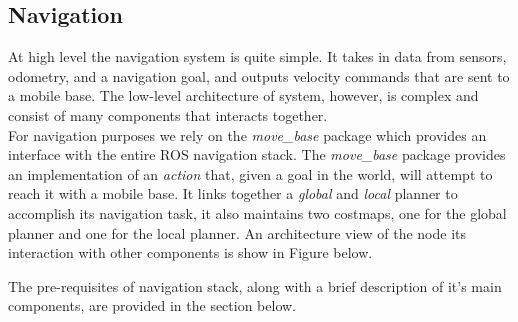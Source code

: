 \subsection{Navigation}
At high level the navigation system is quite simple. It takes in data from sensors,
odometry, and a navigation goal, and outputs velocity commands that are sent to a 
mobile base. The low-level architecture of system, however, is complex and consist 
of many components that interacts together.
\\
For navigation purposes we rely on the \textit{move\_base} package which provides 
an interface with the entire ROS navigation stack. The \textit{move\_base} package
provides an implementation of an \textit{action} that, given a goal in the world,
will attempt to reach it with a mobile base. It links together a \textit{global} and 
\textit{local} planner to accomplish its navigation task, it also maintains two 
costmaps, one for the global planner and one for the local planner.
An architecture view of the node its interaction with other components is show in 
Figure below. %

The pre-requisites of navigation stack, along with a brief description of it's main 
components, are provided in the section below.

